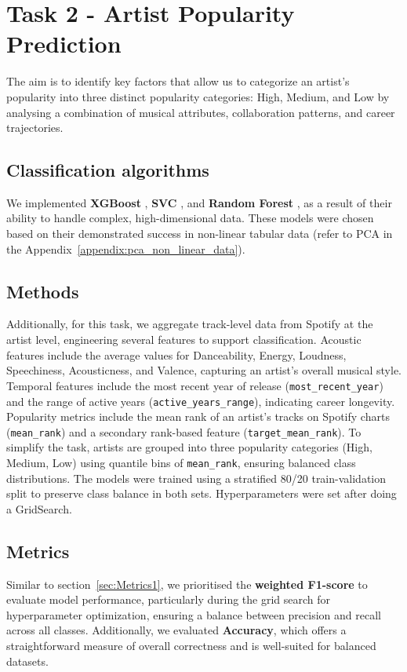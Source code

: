 \documentclass{article}
\begin{document}
\section{Task 2 - Artist Popularity Prediction}

The aim is to identify key factors that allow us to categorize an artist's popularity into three distinct popularity categories: High, Medium, and Low by analysing a combination of musical attributes, collaboration patterns, and career trajectories. 

\subsection{Classification algorithms}

We implemented \textbf{XGBoost} \cite{Friedman2001}, \textbf{SVC} \cite{Brereton2010Support}, and \textbf{Random Forest} \cite{Breiman2001}, as a result of their ability to handle complex, high-dimensional data. These models were chosen based on their demonstrated success in non-linear tabular data (refer to PCA in the Appendix~\ref{appendix:pca_non_linear_data}).

\subsection{Methods}
Additionally, for this task, we aggregate track-level data from Spotify at the artist level, engineering several features to support classification. Acoustic features include the average values for Danceability, Energy, Loudness, Speechiness, Acousticness, and Valence, capturing an artist's overall musical style. 
Temporal features include the most recent year of release (\texttt{most\_recent\_year}) and the range of active years (\texttt{active\_years\_range}), indicating career longevity. Popularity metrics include the mean rank of an artist's tracks on Spotify charts (\texttt{mean\_rank}) and a secondary rank-based feature (\texttt{target\_mean\_rank}). To simplify the task, artists are grouped into three popularity categories (High, Medium, Low) using quantile bins of \texttt{mean\_rank}, ensuring balanced class distributions.
The models were trained using a stratified 80/20 train-validation split to preserve class balance in both sets. Hyperparameters were set after doing a GridSearch.

\subsection{Metrics}
Similar to section~\ref{sec:Metrics1}, we prioritised the \textbf{weighted F1-score} to evaluate model performance, particularly during the grid search for hyperparameter optimization, ensuring a balance between precision and recall across all classes. Additionally, we evaluated \textbf{Accuracy}, which offers a straightforward measure of overall correctness and is well-suited for balanced datasets.
\end{document}
